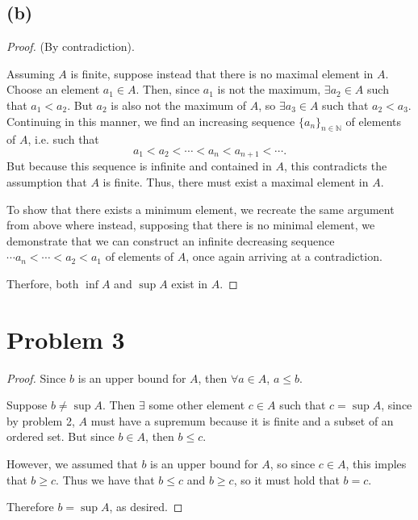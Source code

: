 \documentclass{article}
\begin{document}
\subsection*{(b)}
\begin{proof}
	(By contradiction).
	
	Assuming $A$ is finite, suppose instead that there is no maximal element in $A$. Choose an element $a_1 \in A$. Then, since $a_1$ is not the maximum, $\exists a_2 \in A$ such that $a_1 < a_2$. But $a_2$ is also not the maximum of $A$, so $\exists a_3 \in A$ such that $a_2 < a_3$. Continuing in this manner, we find an increasing sequence $\{a_n\}_{n\in\mathbb{N}}$ of elements of $A$, i.e. such that 
	\begin{equation}
		a_1 < a_2 < \cdots < a_n < a_{n+1} < \cdots.
	\end{equation}
	But because this sequence is infinite and contained in $A$, this contradicts the assumption that $A$ is finite. Thus, there must exist a maximal element in $A$. 
	
	To show that there exists a minimum element, we recreate the same argument from above where instead, supposing that there is no minimal element, we demonstrate that we can construct an infinite decreasing sequence \\$\cdots a_n < \cdots <a_2 < a_1$ of elements of $A$, once again arriving at a contradiction.
	
	Therfore, both $\inf{A}$ and $\sup{A}$ exist in $A$.
\end{proof}

\section*{Problem 3}
\begin{proof}
	Since $b$ is an upper bound for $A$, then $\forall a\in A$, $a\leq b$. 
	
	Suppose $b \neq \sup{A}$. Then $\exists$ some other element $c \in A$ such that $c = \sup{A}$, since by problem 2, $A$ must have a supremum because it is finite and a subset of an ordered set. But since $b \in A$, then $b \leq c$. 
	
	However, we assumed that $b$ is an upper bound for $A$, so since $c \in A$, this imples that $b \geq c$. Thus we have that $b \leq c$ and $b \geq c$, so it must hold that $b=c$.
	
	Therefore $b = \sup{A}$, as desired. 
\end{proof}
\end{document}
